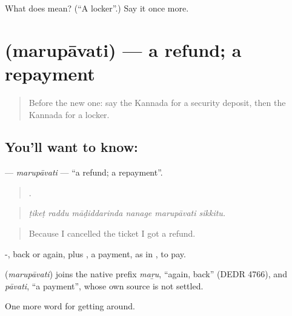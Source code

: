 \begin{tcolorbox}[breakable,colback=teal!4,colframe=teal!35!black,title={Before you move on}]
What does  mean? (\textquotedblleft{}A locker\textquotedblright{}.) Say it once more.
\end{tcolorbox}
\section[\texorpdfstring{\kn{ಮರುಪಾವತಿ} (marupāvati)}{ಮರುಪಾವತಿ (marupāvati)}]{ (marupāvati) — a refund; a repayment}

\label{lesson:KA-C461-marupavati}



\begin{quote}
Before the new one: say the Kannada for a security deposit, then the Kannada for a locker.
\end{quote}

\subsection*{You'll want to know: }
\textbf{} — \emph{marupāvati} — \textquotedblleft{}a refund; a repayment\textquotedblright{}.

\begin{quote}
     .
\end{quote}

\begin{quote}
\emph{ṭikeṭ raddu māḍiddarinda nanage marupāvati sikkitu.}
\end{quote}

\begin{quote}
Because I cancelled the ticket I got a refund.
\end{quote}

-, back or again, plus , a payment, as in , to pay.

\begin{cousinweb}
\textbf{} (\emph{marupāvati}) joins the native prefix \emph{maṟu}, \textquotedblleft{}again, back\textquotedblright{} (DEDR 4766), and \emph{pāvati}, \textquotedblleft{}a payment\textquotedblright{}, whose own source is not settled.
\end{cousinweb}

\begin{grammarlens}[title={What you've built}]
One more word for getting around.
\end{grammarlens}

